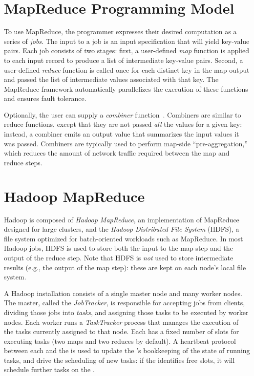 \section{MapReduce Programming Model}
\label{ch:mrback:sec:progmodel}
To use MapReduce, the programmer expresses their desired computation as a series
of \emph{jobs}. The input to a job is an input specification that will yield
key-value pairs. Each job consists of two stages: first, a user-defined
\emph{map} function is applied to each input record to produce a list of
intermediate key-value pairs. Second, a user-defined \emph{reduce} function is
called once for each distinct key in the map output and passed the list of
intermediate values associated with that key.  The MapReduce framework
automatically parallelizes the execution of these functions and ensures fault
tolerance.

Optionally, the user can supply a \emph{combiner}
function~\cite{mapreduce-osdi}. Combiners are similar to reduce functions,
except that they are not passed \emph{all} the values for a given key: instead,
a combiner emits an output value that summarizes the input values it was
passed. Combiners are typically used to perform map-side ``pre-aggregation,''
which reduces the amount of network traffic required between the map and reduce
steps.

\section{Hadoop MapReduce}
Hadoop is composed of \emph{Hadoop MapReduce}, an implementation of
MapReduce designed for large clusters, and the \emph{Hadoop
  Distributed File System} (HDFS), a file system optimized for
batch-oriented workloads such as MapReduce. In most Hadoop jobs, HDFS
is used to store both the input to the map step and the output of the
reduce step. Note that HDFS is \emph{not} used to store intermediate
results (e.g., the output of the map step): these are kept on each
node's local file system.

A Hadoop installation consists of a single master node and many worker
nodes. The master, called the \emph{JobTracker}, is responsible for
accepting jobs from clients, dividing those jobs into \emph{tasks},
and assigning those tasks to be executed by worker nodes. Each worker
runs a \emph{TaskTracker} process that manages the execution of the
tasks currently assigned to that node. Each {\TT} has a fixed number
of slots for executing tasks (two maps and two reduces by
default). A heartbeat protocol between each {\TT} and the {\JT} is used
to update the {\JT}'s bookkeeping of the state of running tasks, and
drive the scheduling of new tasks: if the \JT identifies free {\TT}
slots, it will schedule further tasks on the {\TT}.


